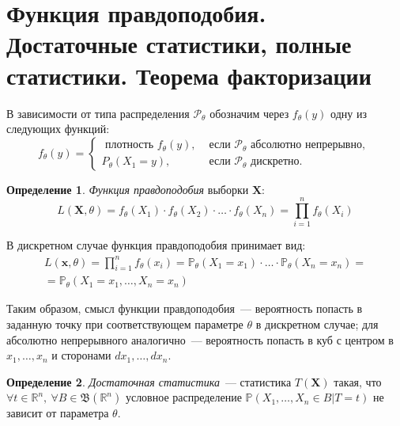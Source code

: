 \documentclass[oneside,final,14pt]{extreport}
\theoremstyle{plain}
\theoremstyle{definition}
\newtheorem*{defn}{Определение}
\theoremstyle{named}
\begin{document}
\section{Функция правдоподобия. Достаточные статистики, полные статистики. Теорема факторизации}

В зависимости от типа распределения $\mathcal{P}_\theta$ обозначим через $f_{\theta}(y)$ одну из следующих функций:
\begin{equation*}
    f_{\theta}(y) =
    \left\{\begin{array}{ll}
    \text { плотность } f_{\theta}(y), & \text { если } \mathcal{P}_{\theta} \text { абсолютно непрерывно, } \\
    P_{\theta}\left(X_{1}=y\right), & \text { если } \mathcal{P}_{\theta} \text { дискретно. }
    \end{array}\right.
\end{equation*}

\begin{defn}
{\it Функция правдоподобия} выборки $\mathbf{X}$:
\begin{equation*}
    L(\mathbf{X} , \theta)=f_{\theta}\left(X_{1}\right) \cdot f_{\theta}\left(X_{2}\right) \cdot \ldots \cdot f_{\theta}\left(X_{n}\right)=\prod_{i=1}^{n} f_{\theta}\left(X_{i}\right)
\end{equation*}
\end{defn}

В дискретном случае функция правдоподобия принимает вид:
\begin{equation*}
\begin{aligned}
    L(\mathbf{x} , \theta)=\prod_{i=1}^{n} f_{\theta}(x_{i}) 
    = \mathbb{P}_{\theta}(X_{1}=x_{1}) \cdot \ldots \cdot \mathbb{P}_{\theta}(X_{n}=x_{n}) = \\
    = \mathbb{P}_{\theta}(X_{1}=x_{1}, \ldots, X_{n}=x_{n})
\end{aligned}
\end{equation*}

Таким образом, смысл функции правдоподобия~--- вероятность попасть в заданную точку при соответствующем параметре $\theta$ в дискретном случае; для абсолютно непрерывного аналогично~--- вероятность попасть в куб с центром в $x_1, \ldots, x_n$ и сторонами $dx_1, \ldots, dx_n$.

\begin{defn}
{\it Достаточная статистика}~--- статистика $T(\mathbf{X})$ такая, что $\forall t \in \mathbb{R}^{n},~ \forall B \in \mathfrak{B}(\mathbb{R}^{n})$ условное распределение $\mathbb{P}(X_1, \ldots, X_n \in B | T=t)$ не зависит от параметра $\theta$.
\end{defn}
\end{document}
